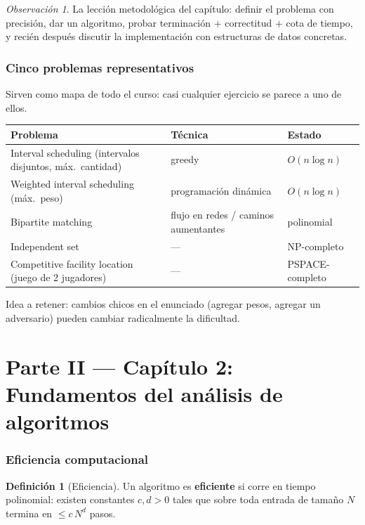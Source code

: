 \documentclass[11pt,a4paper]{article}
\theoremstyle{plain}
\theoremstyle{definition}
\newtheorem{definicion}[teorema]{Definición}
\theoremstyle{remark}
\newtheorem*{observacion}{Observación}
\begin{document}
\begin{observacion}
La lección metodológica del capítulo: definir el problema con precisión, dar un
algoritmo, probar terminación $+$ correctitud $+$ cota de tiempo, y recién después
discutir la implementación con estructuras de datos concretas.
\end{observacion}

\section{Cinco problemas representativos}

Sirven como mapa de todo el curso: casi cualquier ejercicio se parece a uno de ellos.

\begin{center}\small
\begin{tabular}{@{}lll@{}}
\toprule
\textbf{Problema} & \textbf{Técnica} & \textbf{Estado} \\
\midrule
Interval scheduling (intervalos disjuntos, máx.\ cantidad) & greedy & $O(n\log n)$ \\
Weighted interval scheduling (máx.\ peso) & programación dinámica & $O(n\log n)$ \\
Bipartite matching & flujo en redes / caminos aumentantes & polinomial \\
Independent set & --- & NP-completo \\
Competitive facility location (juego de 2 jugadores) & --- & PSPACE-completo \\
\bottomrule
\end{tabular}
\end{center}

\noindent Idea a retener: cambios chicos en el enunciado (agregar pesos, agregar un
adversario) pueden cambiar radicalmente la dificultad.

\part*{Parte II --- Capítulo 2: Fundamentos del análisis de algoritmos}

\section{Eficiencia computacional}

\begin{definicion}[Eficiencia]
Un algoritmo es \textbf{eficiente} si corre en tiempo polinomial: existen
constantes $c,d>0$ tales que sobre toda entrada de tamaño $N$ termina en
$\le c\,N^d$ pasos.
\end{definicion}
\end{document}
